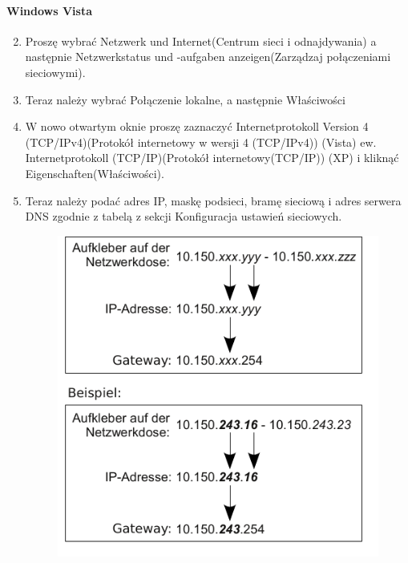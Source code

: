 \documentclass[a4paper,12pt]{scrartcl}
\begin{document}
\paragraph*{Windows Vista}
\begin{enumerate}
    \setcounter{enumi}{1}
    \item Proszę wybrać Netzwerk und Internet(Centrum sieci i odnajdywania) a następnie Netzwerkstatus und -aufgaben anzeigen(Zarządzaj połączeniami sieciowymi).
    \item Teraz należy wybrać Połączenie lokalne, a następnie Właściwości
    \setcounter{enumi}{4}
    \item W nowo otwartym oknie proszę zaznaczyć Internetprotokoll Version 4 (TCP/IPv4)(Protokół internetowy w wersji 4 (TCP/IPv4)) (Vista) ew. Internetprotokoll  (TCP/IP)(Protokół internetowy(TCP/IP)) (XP) i kliknąć Eigenschaften(Właściwości).
    \item Teraz należy podać adres IP, maskę podsieci, bramę sieciową i adres serwera DNS zgodnie z tabelą z sekcji Konfiguracja ustawień sieciowych.
      \begin{figure}[h!]
	\centering
        \vspace{-5pt}
        \begin{minipage}[c]{0.45\linewidth}
          \centering
          \includegraphics[width=\linewidth,keepaspectratio]{Bilder/IP_Gerneric}

\end{minipage}
\end{figure}
\end{enumerate}
\end{document}
